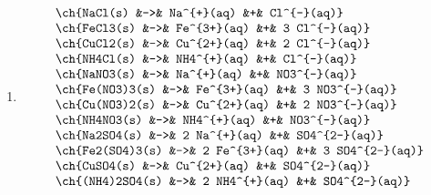 \begin{enumerate}
    \item \mbox{}
          \[
              \begin{array}{lclcl}
                  \ch{NaCl(s)      &->& Na^{+}(aq)    &+& Cl^{-}(aq)} \\
                  \ch{FeCl3(s)     &->& Fe^{3+}(aq)   &+& 3 Cl^{-}(aq)} \\
                  \ch{CuCl2(s)     &->& Cu^{2+}(aq)   &+& 2 Cl^{-}(aq)} \\
                  \ch{NH4Cl(s)     &->& NH4^{+}(aq)   &+& Cl^{-}(aq)} \\
                  \ch{NaNO3(s)     &->& Na^{+}(aq)    &+& NO3^{-}(aq)} \\
                  \ch{Fe(NO3)3(s)  &->& Fe^{3+}(aq)   &+& 3 NO3^{-}(aq)} \\
                  \ch{Cu(NO3)2(s)  &->& Cu^{2+}(aq)   &+& 2 NO3^{-}(aq)} \\
                  \ch{NH4NO3(s)    &->& NH4^{+}(aq)   &+& NO3^{-}(aq)} \\
                  \ch{Na2SO4(s)    &->& 2 Na^{+}(aq)  &+& SO4^{2-}(aq)} \\
                  \ch{Fe2(SO4)3(s) &->& 2 Fe^{3+}(aq) &+& 3 SO4^{2-}(aq)} \\
                  \ch{CuSO4(s)     &->& Cu^{2+}(aq)   &+& SO4^{2-}(aq)} \\
                  \ch{(NH4)2SO4(s) &->& 2 NH4^{+}(aq) &+& SO4^{2-}(aq)}
              \end{array}
          \]



\end{enumerate}


